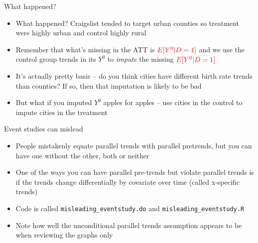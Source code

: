 \documentclass{beamer}
\begin{document}
\begin{frame}{What happened?}

\begin{itemize}
\item What happened?  Craigslist tended to target urban counties so treatment were highly urban and control highly rural
\item Remember that what's missing in the ATT is $\textcolor{red}{E[Y^0|D=1]}$ and we use the control group trends in its $Y^0$ to \emph{impute} the missing $\textcolor{red}{E[Y^0|D=1]}$
\item It's actually pretty basic -- do you think cities have different birth rate trends than counties?  If so, then that imputation is likely to be bad
\item But what if you imputed $Y^0$ apples for apples -- use cities in the control to impute cities in the treatment

\end{itemize}
\end{frame}








\begin{frame}{Event studies can mislead}

\begin{itemize}

\item People mistakenly equate parallel trends with parallel pretrends, but you can have one without the other, both or neither
\item One of the ways you can have parallel pre-trends but violate parallel trends is if the trends change differentially by covariate over time (called x-specific trends)
\item Code is called \texttt{misleading_eventstudy.do} and \texttt{misleading_eventstudy.R}
\item Note how well the unconditional parallel trends assumption appears to be when reviewing the graphs only
\end{itemize}

\end{frame}
\end{document}
